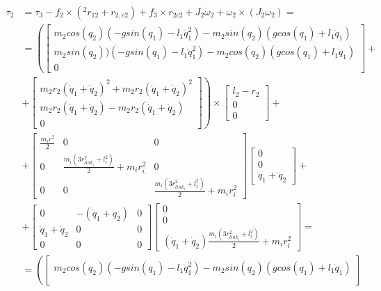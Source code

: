 \documentclass[a4paper,14pt]{extreport}
\begin{document}
\begin{itemize}
\begin{align*}
\tau_2 &= \tau_3 - f_2 \times (^2 r_{12} + r_{2,c2}) + f_3 \times r_{2c2} + J_2 \dot \omega_2 + \omega_2 \times (J_2 \omega_2) =\\
&=
\left(
\begin{bmatrix}
m_2 cos(q_2) (-g sin(q_1) - l_1 \ddot q_1^2) - m_2 sin(q_2) (g cos(q_1) + l_1 \ddot q_1)\\
m_2 sin(q_2) ) (-g sin(q_1) - l_1 \ddot q_1^2) - m_2 cos(q_2) (g cos(q_1) + l_1 \ddot q_1)\\
0
\end{bmatrix}
\right.
+\\
&+
\left.
\begin{bmatrix}
m_2 r_2 (\dot q_1 + \dot q_2)^2 + m_2 r_2(\dot q_1 + \dot q_2)^2\\
m_2 r_2 (\ddot q_1 + \ddot q_2) - m_2 r_2(\ddot q_1 + \ddot q_2)\\
0
\end{bmatrix}
\right) \times
\begin{bmatrix}
l_2 - r_2\\
0\\
0
\end{bmatrix}
+\\
&+
\begin{bmatrix}
\frac{m_{i} r^{2}}{2} & 0 & 0 \\ 
0 & \frac{m_i (3 r_{link_i}^2 + l_i^2)}{2} + m_i r_i^2 & 0\\
0 & 0 & \frac{m_i (3 r_{link_i}^2 + l_i^2)}{2} + m_i r_i^2
\end{bmatrix}
\begin{bmatrix}
0\\
0\\
\ddot q_1 + \ddot q_2
\end{bmatrix}
+\\
&+
\begin{bmatrix}
0 & -(\dot q_1 + \dot q_2) & 0\\
\dot q_1 + \dot q_2 & 0 & 0\\
0&0&0
\end{bmatrix}
\begin{bmatrix}
0\\
0\\
(\dot q_1 + \dot q_2)\frac{m_i (3 r_{link_i}^2 + l_i^2)}{2} + m_i r_i^2
\end{bmatrix}
=\\
&=
\left(
\begin{bmatrix}
m_2 cos(q_2) (-g sin(q_1) - l_1 \ddot q_1^2) - m_2 sin(q_2) (g cos(q_1) + l_1 \ddot q_1)\\

\end{bmatrix}
\end{align*}
\end{itemize}
\end{document}
